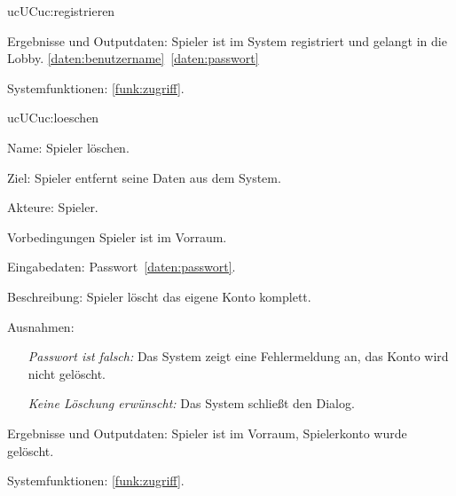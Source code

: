 \begin{description}[leftmargin=5em, style=sameline]
\begin{lhp}{uc}{UC}{uc:registrieren}
\begin{itemize}
			\end{itemize}
		\item [Ergebnisse und Outputdaten:] Spieler ist im System registriert und gelangt in die Lobby. \ref{daten:benutzername}~\ref{daten:passwort}	
		\item [Systemfunktionen:] \ref{funk:zugriff}.
	\end{lhp}
	
	\begin{lhp}{uc}{UC}{uc:loeschen}
		\item [Name:] Spieler löschen.
		\item [Ziel:] Spieler entfernt seine Daten aus dem System.
		\item [Akteure:] Spieler.
		\item [Vorbedingungen] Spieler ist im Vorraum.
		\item [Eingabedaten:] Passwort~\ref{daten:passwort}.
		\item [Beschreibung:] Spieler löscht das eigene Konto komplett.
		\item [Ausnahmen:] \hfill
			\begin{itemize} 
				\item[] \textit{Passwort ist falsch:} Das System zeigt eine Fehlermeldung an, das Konto wird nicht gelöscht.
				\item[] \textit{Keine Löschung erwünscht:} Das System schließt den Dialog.
				
			\end{itemize}
		\item [Ergebnisse und Outputdaten:] Spieler ist im Vorraum, Spielerkonto wurde gelöscht.	
		\item [Systemfunktionen:] \ref{funk:zugriff}.
	\end{lhp}

\end{description}